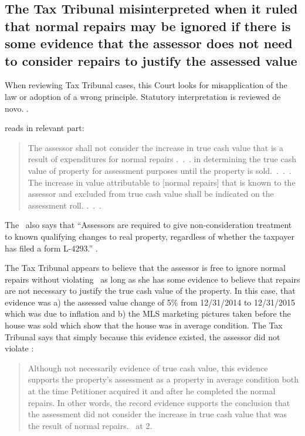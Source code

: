 \documentclass[12pt,\documentclassflag]{michiganCourtOfAppealsBrief}
\begin{document}
\subsection{The Tax Tribunal misinterpreted \mathieuGast when it ruled that normal repairs may be ignored if there is some evidence that the assessor does not need to consider repairs to justify the assessed value}

When reviewing Tax Tribunal cases, this Court looks for misapplication of the law or adoption of a wrong principle. Statutory interpretation is reviewed de novo. . 

\mathieuGast reads in relevant part:

\begin{quote}
	The assessor shall not consider the increase in true cash value that is a result of expenditures for normal repairs .~.~. in determining the true cash value of property for assessment purposes until the property is sold.~.~.~. The increase in value attributable to [normal repairs] that is known to the assessor and excluded from true cash value shall be indicated on the assessment roll. .~.~.
\end{quote}

The \STC\ also says that ``Assessors are required to give non-consideration treatment to known qualifying changes to real property, regardless of whether the taxpayer has filed a form L-4293.'' .

The Tax Tribunal appears to believe that the assessor is free to ignore normal repairs without violating \mathieuGast\ as long as she has some evidence to believe that repairs are not necessary to justify the true cash value of the property. In this case, that evidence was a) the assessed value change of 5\% from 12/31/2014 to 12/31/2015 which was due to inflation and b) the MLS marketing pictures taken before the house was sold which show that the house was in average condition. The Tax Tribunal says that simply because this evidence existed, the assessor did not violate \mathieuGast: 

\begin{quote}
	Although not necessarily evidence of true cash value, this evidence supports the property's assessment as a property in average condition both at the time Petitioner acquired it and after he completed the normal repairs. In other words, the record evidence supports the conclusion that the assessment did not consider the increase in true cash value that was the result of normal repairs. \reconsiderationDenied\ at 2. 
\end{quote}
 
\end{document}
